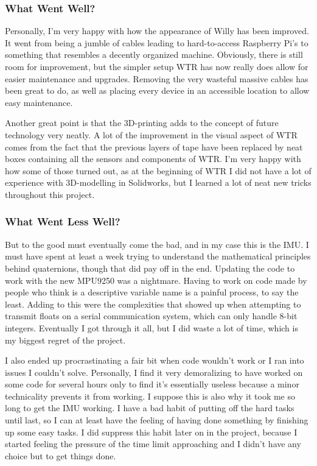 \subsubsection{What Went Well?}
Personally, I'm very happy with how the appearance of Willy has been improved.
It went from being a jumble of cables leading to hard-to-access Raspberry Pi's to something that resembles a decently organized machine.
Obviously, there is still room for improvement, but the simpler setup WTR has now really does allow for easier maintenance and upgrades.
Removing the very wasteful massive cables has been great to do, as well as placing every device in an accessible location to allow easy maintenance.

Another great point is that the 3D-printing adds to the concept of future technology very neatly.
A lot of the improvement in the visual aspect of WTR comes from the fact that the previous layers of tape have been replaced by neat boxes containing all the sensors and components of WTR.
I'm very happy with how some of those turned out, as at the beginning of WTR I did not have a lot of experience with 3D-modelling in Solidworks, but I learned a lot of neat new tricks throughout this project.

\subsubsection{What Went Less Well?}
But to the good must eventually come the bad, and in my case this is the IMU.
I must have spent at least a week trying to understand the mathematical principles behind quaternions, though that did pay off in the end.
Updating the code to work with the new MPU9250 was a nightmare.
Having to work on code made by people who think  is a descriptive variable name is a painful process, to say the least.
Adding to this were the complexities that showed up when attempting to transmit floats on a serial communication system, which can only handle 8-bit integers.
Eventually I got through it all, but I did waste a lot of time, which is my biggest regret of the project.

I also ended up procrastinating a fair bit when code wouldn't work or I ran into issues I couldn't solve.
Personally, I find it very demoralizing to have worked on some code for several hours only to find it's essentially useless because a minor technicality prevents it from working.
I suppose this is also why it took me so long to get the IMU working.
I have a bad habit of putting off the hard tasks until last, so I can at least have the feeling of having done something by finishing up some easy tasks.
I did suppress this habit later on in the project, because I started feeling the pressure of the time limit approaching and I didn't have any choice but to get things done.

